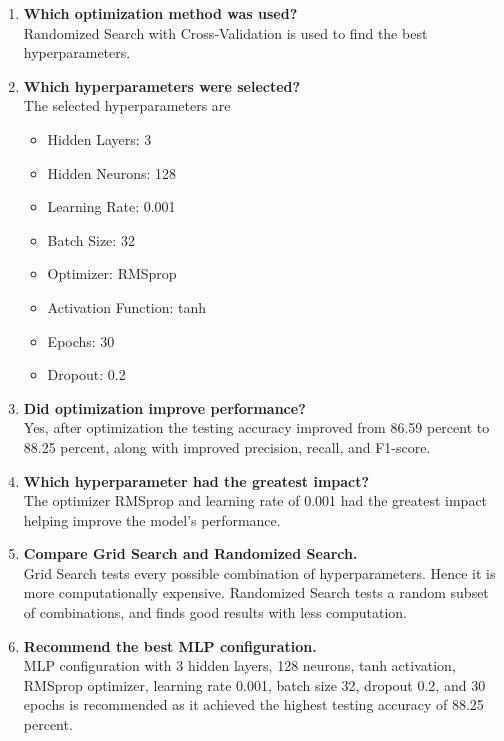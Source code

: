 \documentclass[11pt]{article}
\begin{document}
\begin{enumerate}
\item \textbf{Which optimization method was used?}\\
Randomized Search with Cross-Validation is used to find the best hyperparameters.
\vspace{5mm}
\item \textbf{Which hyperparameters were selected?}\\
The selected hyperparameters are
\begin{itemize}
        \item Hidden Layers: 3
        \item Hidden Neurons: 128
        \item Learning Rate: 0.001
        \item Batch Size: 32
        \item Optimizer: RMSprop
        \item Activation Function: tanh
        \item Epochs: 30
        \item Dropout: 0.2
    \end{itemize}
\vspace{5mm}

\item \textbf{Did optimization improve performance?}\\
Yes, after optimization the testing accuracy improved from 86.59 percent to 88.25 percent, along with improved precision, recall, and F1-score.
\vspace{5mm}

\item \textbf{Which hyperparameter had the greatest impact?}\\
The optimizer RMSprop and learning rate of 0.001 had the greatest impact helping improve the model's performance.
\vspace{5mm}

\item \textbf{Compare Grid Search and Randomized Search.}\\
Grid Search tests every possible combination of hyperparameters. Hence it is more computationally expensive.
Randomized Search tests a random subset of combinations, and finds good results with less computation.
\vspace{5mm}

\item \textbf{Recommend the best MLP configuration.}\\
MLP configuration with 3 hidden layers, 128 neurons, tanh activation, RMSprop optimizer, learning rate 0.001, batch size 32, dropout 0.2, and 30 epochs is recommended as it achieved the highest testing accuracy of 88.25 percent.
\end{enumerate}
\end{document}
